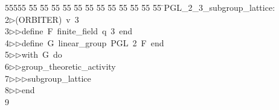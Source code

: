 %
%
\begin{tabbing}
55555 \= 55 \= 55 \= 55 \= 55 \= 55 \= 55 \= 55 \= 55 \= 55 \= 55 \= 55 \= 55 \= \>PGL\_2\_3\_subgroup\_lattice:\\[0pt]
2\>$\triangleright$\>(ORBITER)\ v\ 3\ \\[0pt]
3\>$\triangleright$\>$\triangleright$\>define\ F\ finite\_field\ q\ 3\ end\ \\[0pt]
4\>$\triangleright$\>$\triangleright$\>define\ G\ linear\_group\ PGL\ 2\ F\ end\ \\[0pt]
5\>$\triangleright$\>$\triangleright$\>with\ G\ do\ \\[0pt]
6\>$\triangleright$\>$\triangleright$\>group\_theoretic\_activity\ \\[0pt]
7\>$\triangleright$\>$\triangleright$\>$\triangleright$\>subgroup\_lattice\ \\[0pt]
8\>$\triangleright$\>$\triangleright$\>end\\[0pt]
9\>\end{tabbing}

